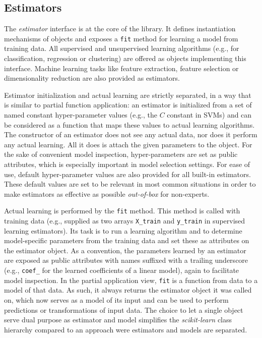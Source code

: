 \documentclass{llncs}
\newcommand{\sklearn}{\textit{scikit-learn}\xspace}
\begin{document}
\subsection{Estimators}
\label{sec:estimators}

The \textit{estimator} interface is at the core of the
library. It defines instantiation mechanisms of objects and exposes a
\texttt{fit} method for learning a model from training data.  All supervised and
unsupervised learning algorithms (e.g., for classification, regression or
clustering) are offered as objects implementing this interface. Machine
learning tasks like feature extraction, feature selection or dimensionality
reduction are also provided as estimators.

Estimator initialization and actual learning are strictly separated,
in a way that is similar to partial function application:
an estimator is initialized from a set of named constant hyper-parameter values
(e.g., the $C$ constant in SVMs)
and can be considered as a function
that maps these values to actual learning algorithms.
The constructor of an estimator does not see any actual data, nor does it perform any actual learning.
All it does is attach the given parameters to the object.
For the sake of convenient model inspection, hyper-parameters are set as public attributes,
which is especially important in model selection settings.
For ease of use, default hyper-parameter values are also provided
for all built-in estimators.
These default values are set to be relevant in most common
situations in order to make estimators as effective as possible
\textit{out-of-box} for non-experts.

Actual learning is performed by the \texttt{fit} method. This method is called
with training data (e.g., supplied as two arrays \texttt{X\_train} and
\texttt{y\_train} in supervised learning estimators). Its task is to run a
learning algorithm and to determine model-specific parameters from the training
data and set these as attributes on the estimator object. As a convention, the
parameters learned by an estimator are exposed as public attributes with names
suffixed with a trailing underscore (e.g., \texttt{coef\_} for the
learned coefficients of a linear model),
again to facilitate model inspection.
In the partial application view,
\texttt{fit} is a function from data to a model of that data.
As such, it always returns the estimator object it was called on,
which now serves as a model of its input and can be used to perform predictions or transformations of input data.
The choice to let a single object serve dual purpose as estimator and model
simplifies the \sklearn class hierarchy
compared to an approach were estimators and models are separated.
\end{document}
